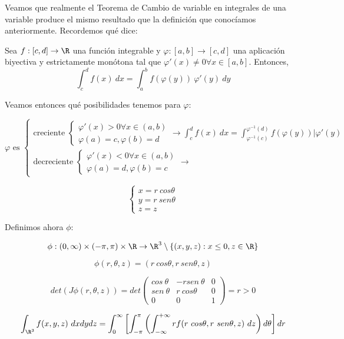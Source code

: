 \begin{nota} %
 Veamos que realmente el Teorema de Cambio de variable en integrales de una
 variable produce el mismo resultado que la definición que conocíamos
 anteriormente. Recordemos qué dice:

 Sea $f: [c, d] \rightarrow \R$ una función integrable y $\varphi: [a, b]
\rightarrow [c, d]$ una aplicación biyectiva y estrictamente monótona tal que $\varphi'(x) \neq 0 \forall
x \in [a, b]$. Entonces,
$$\int_c^df(x) \ dx = \int_a^bf(\varphi(y)) \ \varphi'(y)
\ dy$$

Veamos entonces qué posibilidades tenemos para $\varphi$:

$$ \varphi \text{ es }
\begin{cases}
  \text{creciente }
  \begin{cases}
    \varphi'(x) > 0 \forall x \in (a,b) \\
    \varphi(a) = c, \varphi(b) = d
  \end{cases}
  \rightarrow \int_c^d f(x) \ dx = \int_{\varphi^{-1}(c)}^{\varphi^{-1}(d)}
  f(\varphi(y)) |\varphi'(y) \\
  \text{decreciente }
  \begin{cases}
    \varphi'(x) < 0 \forall x \in (a,b) \\
    \varphi(a) = d, \varphi(b) = c
  \end{cases}
  \rightarrow
\end{cases}$$

\end{nota}


\begin{ejemplo}
  $$
\begin{cases}
  x = r \ cos \theta \\
  y = r \ sen \theta \\
  z = z
\end{cases}
$$

Definimos ahora $\phi$:

$$\phi : (0, \infty) \times (-\pi, \pi) \times \R \rightarrow \R^3 \setminus
\{(x,y,z) : x \leq 0, z \in \R \}$$

$$\phi(r, \theta, z) = (r \ cos \theta, r \ sen \theta, z)$$

$$det(J \phi (r, \theta, z)) = det
\begin{pmatrix}
  cos \ \theta & -rsen \ \theta & 0 \\
  sen \ \theta & r \ cos \theta & 0 \\
  0 & 0 & 1
\end{pmatrix} = r > 0$$

$$\int_{\R^3}f(x,y,z) \ dxdydz = \int_0^{\infty} \left[ \int_{-\pi}^{\pi} \left(
  \int_{-\infty}^{+\infty}rf(r \ cos \theta, r \ sen \theta, z) \ dz \right) d
\theta \right]dr$$
\end{ejemplo}



